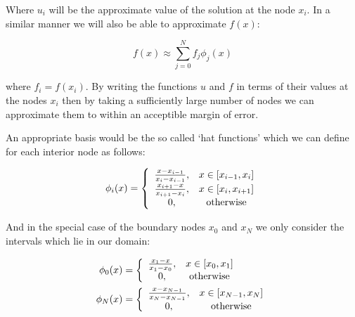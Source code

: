 Where $u_i$ will be the approximate value of the solution at the node $x_i$. In
a similar manner we will also be able to approximate $f(x)$:

\begin{equation}
    f(x) \approx \sum_{j = 0}^N f_j\phi_j(x)
\end{equation}

where $f_i = f(x_i)$. By writing the functions $u$ and $f$ in terms of their
values at the nodes $x_i$ then by taking a sufficiently large number of nodes
we can approximate them to within an acceptible margin of error.


An appropriate basis would be the so called `hat functions' which we can define
for each interior node as follows:

\begin{equation}\label{eq:one-d-hat-basis}
    \phi_i(x) = \left\{\begin{array}{c c}
                    \frac{x - x_{i-1}}{x_i - x_{i - 1}}, & x \in [x_{i-1}, x_i] \\
                    \frac{x_{i+1} - x}{x_{i + 1} - x_i}, & x \in [x_i, x_{i + 1}] \\
                    0, & \text{otherwise}
                \end{array}\right.
\end{equation}

And in the special case of the boundary nodes $x_0$ and $x_N$ we only consider
the intervals which lie in our domain:

\begin{align}
    \phi_0(x) &= \left\{\begin{array}{c c}
                    \frac{x_1 - x}{x_1 - x_0}, & x \in [x_0, x_1] \\
                    0, & \text{otherwise}
    \end{array}\right.
    \\
    \phi_N(x) &= \left\{\begin{array}{c c}
                    \frac{x - x_{N - 1}}{x_N - x_{N-1}}, & x \in [x_{N-1}, x_N] \\
                    0, & \text{otherwise}
    \end{array}\right.
\end{align}

